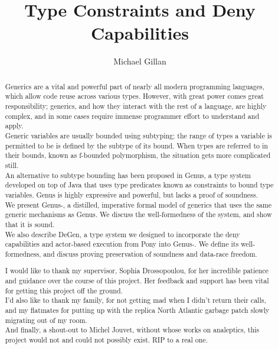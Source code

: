 \documentclass[a4paper, twoside, table, 10pt]{report}
\title{Type Constraints and Deny Capabilities}
\author{Michael Gillan}
\begin{document}


\begin{abstract}

Generics are a vital and powerful part of nearly all modern programming languages, which allow code reuse across various types. However, with great power comes great responsibility; generics, and how they interact with the rest of a language, are highly complex, and in some cases require immense programmer effort to understand and apply. \\

Generic variables are usually bounded using subtyping; the range of types a variable is permitted to be is defined by the subtype of its bound. When types are referred to in their bounds, known as f-bounded polymorphism, the situation gets more complicated still. \\

An alternative to subtype bounding has been proposed in Genus, a type system developed on top of Java that uses type predicates known as constraints to bound type variables. Genus is highly expressive and powerful, but lacks a proof of soundness. \\

We present Genus-, a distilled, imperative formal model of generics that uses the same generic mechanisms as Genus. We discuss the well-formedness of the system, and show that it is sound. \\

We also describe DeGen, a type system we designed to incorporate the deny capabilities and actor-based execution from Pony into Genus-. We define its well-formedness, and discuss proving preservation of soundness and data-race freedom.

\end{abstract}

\renewcommand{\abstractname}{Acknowledgements}
\begin{abstract}

I would like to thank my supervisor, Sophia Drossopoulou, for her incredible patience and guidance over the course of this project. Her feedback and support has been vital for getting this project off the ground. \\

I'd also like to thank my family, for not getting mad when I didn't return their calls, and my flatmates for putting up with the replica North Atlantic garbage patch slowly migrating out of my room. \\

And finally, a shout-out to Michel Jouvet, without whose works on analeptics, this project would not and could not possibly exist. RIP to a real one.

\end{abstract}
\end{document}

